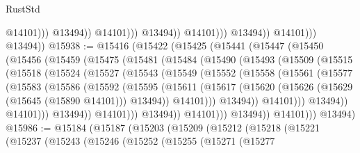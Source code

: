 \begin{lexlean}{RustStd}
\begin{coremodule}
                                            @14101)))
                                      @13494))
                                  @14101)))
                            @13494))
                        @14101)))
                  @13494))
              @14101)))
        @13494))
@15938 := @15416
    (@15422
      (@15425
        (@15441
          (@15447
            (@15450
              (@15456
                (@15459
                  (@15475
                    (@15481
                      (@15484
                        (@15490
                          (@15493
                            (@15509
                              (@15515
                                (@15518
                                  (@15524
                                    (@15527
                                      (@15543
                                        (@15549
                                          (@15552
                                            (@15558
                                              (@15561
                                                (@15577
                                                  (@15583
                                                    (@15586
                                                      (@15592
                                                        (@15595
                                                          (@15611
                                                            (@15617
                                                              (@15620
                                                                (@15626
                                                                  (@15629 (@15645 (@15890 @14101)))
                                                                  @13494))
                                                              @14101)))
                                                        @13494))
                                                    @14101)))
                                              @13494))
                                          @14101)))
                                    @13494))
                                @14101)))
                          @13494))
                      @14101)))
                @13494))
            @14101)))
      @13494)
@15986 := @15184
    (@15187
      (@15203
        (@15209
          (@15212
            (@15218
              (@15221
                (@15237
                  (@15243
                    (@15246
                      (@15252
                        (@15255
                          (@15271
                            (@15277

\end{coremodule}
\end{lexlean}
